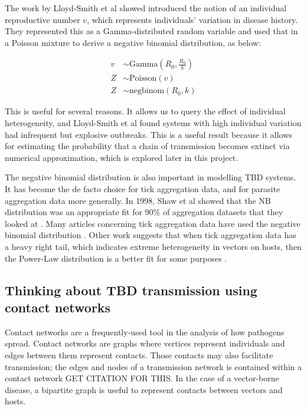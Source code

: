 \documentclass{article}
\begin{document}
The work by Lloyd-Smith et al showed introduced the notion of an individual reproductive number $ v $, which represents individuals' variation in disease history. They represented this as a Gamma-distributed random variable and used that in a Poisson mixture to derive a negative binomial distribution, as below:

\begin{align}\label{PoissonMixture}
	v &\sim \text{Gamma}\left(R_0, \frac{R_0}{k}\right) \nonumber \\
	Z &\sim \text{Poisson}(v) \\
	Z &\sim \text{negbinom}(R_0, k) \nonumber
\end{align}

This is useful for several reasons. It allows us to query the effect of individual heterogeneity, and Lloyd-Smith et al found systems with high individual variation had infrequent but explosive outbreaks. This is a useful result because it allows for estimating the probability that a chain of transmission becomes extinct via numerical approximation, which is explored later in this project.

The negative binomial distribution is also important in modelling TBD systems. It has become the de facto choice for tick aggregation data, and for parasite aggregation data more generally. In 1998, Shaw et al showed that the NB distribution was an appropriate fit for 90\% of aggregation datasets that they looked at \cite{SHAW1998}. Many articles concerning tick aggregation data have used the negative binomial distribution \cite{Bown2003, HARRISON2012, Brunner2008}. Other work suggests that when tick aggregation data has a heavy right tail, which indicates extreme heterogeneity in vectors on hosts, then the Power-Law distribution is a better fit for some purposes \cite{Ferreri2014, Bisanzio2010}.

\subsection{Thinking about TBD transmission using contact networks}

Contact networks are a frequently-used tool in the analysis of how pathogens spread. Contact networks are graphs where vertices represent individuals and edges between them represent contacts. Those contacts may also facilitate transmission; the edges and nodes of a transmission network is contained within a contact network GET CITATION FOR THIS. In the case of a vector-borne disease, a bipartite graph is useful to represent contacts between vectors and hosts.
\end{document}
